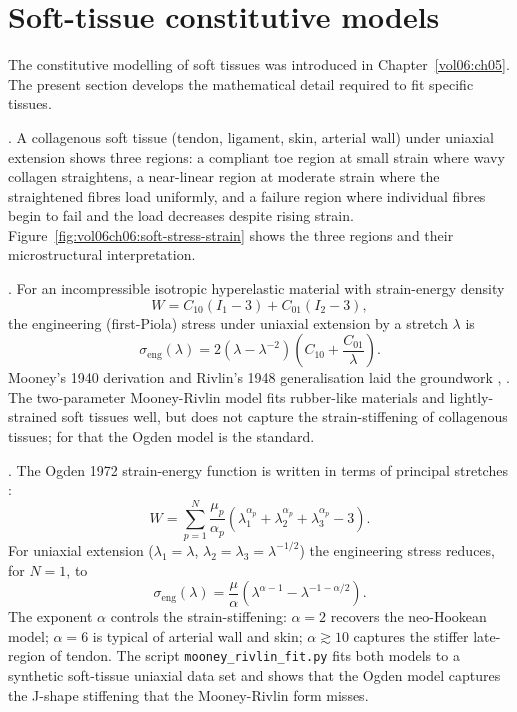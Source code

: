 \section{Soft-tissue constitutive models}

The constitutive modelling of soft tissues was introduced in
Chapter~\ref{vol06:ch05}. The present section develops the
mathematical detail required to fit specific tissues.

. A collagenous soft tissue
(tendon, ligament, skin, arterial wall) under uniaxial extension
shows three regions: a compliant toe region at small strain where
wavy collagen straightens, a near-linear region at moderate strain
where the straightened fibres load uniformly, and a failure region
where individual fibres begin to fail and the load decreases despite
rising strain. Figure~\ref{fig:vol06ch06:soft-stress-strain} shows
the three regions and their microstructural interpretation.



. For an incompressible isotropic
hyperelastic material with strain-energy density
\[
W = C_{10}(I_1 - 3) + C_{01}(I_2 - 3),
\]
the engineering (first-Piola) stress under uniaxial extension by a
stretch $\lambda$ is
\[
\sigma_{\text{eng}}(\lambda) = 2 \left(\lambda - \lambda^{-2}\right)
   \left(C_{10} + \frac{C_{01}}{\lambda}\right).
\]
Mooney's 1940 derivation and Rivlin's 1948 generalisation laid the
groundwork \cite[p.~588]{paper:v6c06-mooney-1940},
\cite[p.~390]{paper:v6c06-rivlin-1948}. The two-parameter Mooney-Rivlin
model fits rubber-like materials and lightly-strained soft tissues
well, but does not capture the strain-stiffening of collagenous
tissues; for that the Ogden model is the standard.

. The Ogden 1972 strain-energy function is written in
terms of principal stretches
\cite[p.~568]{paper:v6c06-ogden-1972}:
\[
W = \sum_{p=1}^{N} \frac{\mu_p}{\alpha_p}
\left(\lambda_1^{\alpha_p} + \lambda_2^{\alpha_p} + \lambda_3^{\alpha_p} - 3\right).
\]
For uniaxial extension ($\lambda_1 = \lambda$, $\lambda_2 = \lambda_3 = \lambda^{-1/2}$)
the engineering stress reduces, for $N = 1$, to
\[
\sigma_{\text{eng}}(\lambda) = \frac{\mu}{\alpha}
   \left(\lambda^{\alpha - 1} - \lambda^{-1 - \alpha/2}\right).
\]
The exponent $\alpha$ controls the strain-stiffening: $\alpha = 2$
recovers the neo-Hookean model; $\alpha = 6$ is typical of arterial
wall and skin; $\alpha \gtrsim 10$ captures the stiffer late-region
of tendon. The script \texttt{mooney\_rivlin\_fit.py} fits both
models to a synthetic soft-tissue uniaxial data set and shows that
the Ogden model captures the J-shape stiffening that the Mooney-Rivlin
form misses.

